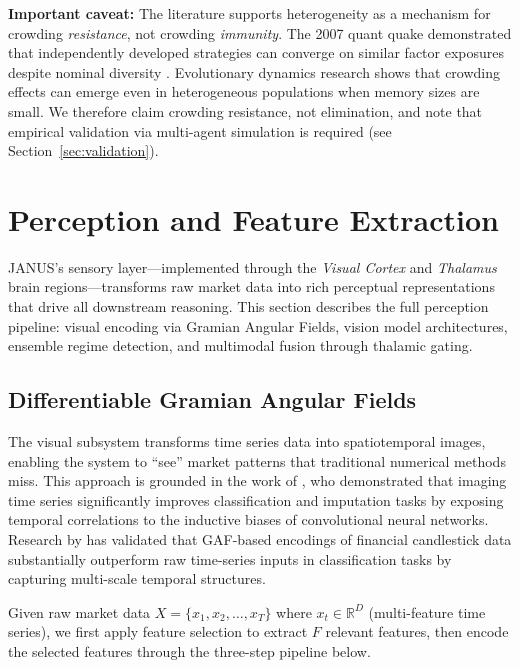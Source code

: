 \documentclass[12pt, a4paper]{article}
\begin{document}
\textbf{Important caveat:} The literature supports heterogeneity as a mechanism for crowding \textit{resistance}, not crowding \textit{immunity}. The 2007 quant quake demonstrated that independently developed strategies can converge on similar factor exposures despite nominal diversity \citep{khandani2011quants}. Evolutionary dynamics research shows that crowding effects can emerge even in heterogeneous populations when memory sizes are small. We therefore claim crowding resistance, not elimination, and note that empirical validation via multi-agent simulation is required (see Section~\ref{sec:validation}).
\section{Perception and Feature Extraction}
\label{sec:perception}

JANUS's sensory layer---implemented through the \emph{Visual Cortex} and \emph{Thalamus} brain regions---transforms raw market data into rich perceptual representations that drive all downstream reasoning. This section describes the full perception pipeline: visual encoding via Gramian Angular Fields, vision model architectures, ensemble regime detection, and multimodal fusion through thalamic gating.

\subsection{Differentiable Gramian Angular Fields}
\label{sec:diffgaf}

The visual subsystem transforms time series data into spatiotemporal images, enabling the system to ``see'' market patterns that traditional numerical methods miss. This approach is grounded in the work of \citet{wang2015imaging}, who demonstrated that imaging time series significantly improves classification and imputation tasks by exposing temporal correlations to the inductive biases of convolutional neural networks. Research by \citet{chen2020encoding} has validated that GAF-based encodings of financial candlestick data substantially outperform raw time-series inputs in classification tasks by capturing multi-scale temporal structures.

Given raw market data $X = \{x_1, x_2, \ldots, x_T\}$ where $x_t \in \mathbb{R}^D$ (multi-feature time series), we first apply feature selection to extract $F$ relevant features, then encode the selected features through the three-step pipeline below.
\end{document}
